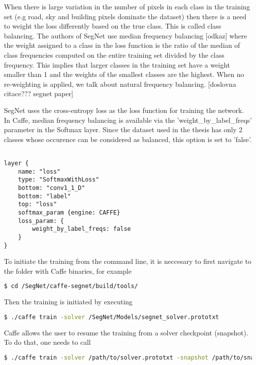 When there is large variation in the number of
pixels in each class in the training set (e.g road, sky and building
pixels dominate the dataset) then there is a need to weight
the loss differently based on the true class. This is called class
balancing. The authors of SegNet use median frequency balancing [odkaz] where the weight assigned to a class in the loss function is the ratio of the
median of class frequencies computed on the entire training set
divided by the class frequency. This implies that larger classes in
the training set have a weight smaller than 1 and the weights
of the smallest classes are the highest. When no re-weighting is applied, we talk about natural frequency balancing. [doslovna citace??? segnet paper]

SegNet uses the cross-entropy loss as the loss function for
training the network. In Caffe, median frequency balancing is available via the 'weight\_by\_label\_freqs' parameter in the Softmax layer. Since the dataset used in the thesis has only 2 classes whose occurence can be considered as balanced, this option is set to 'false'. 

\begin{lstlisting}

layer {
	name: "loss"
	type: "SoftmaxWithLoss"
	bottom: "conv1_1_D"
	bottom: "label"
	top: "loss"
	softmax_param {engine: CAFFE}
	loss_param: {
		weight_by_label_freqs: false	     
	}
}

\end{lstlisting}

To initiate the training from the command line, it is neccesary to first navigate to the folder with Caffe binaries, for example

\begin{lstlisting}[language=bash]
$ cd /SegNet/caffe-segnet/build/tools/
\end{lstlisting}

Then the training is initiated by executing

\begin{lstlisting}[language=bash]
$ ./caffe train -solver /SegNet/Models/segnet_solver.prototxt
\end{lstlisting}

Caffe allows the user to resume the training from a solver checkpoint (snapshot). To do that, one needs to call

\begin{lstlisting}[language=bash]
$ ./caffe train -solver /path/to/solver.prototxt -snapshot /path/to/snapshot_iter_XY.solverstate
\end{lstlisting}


